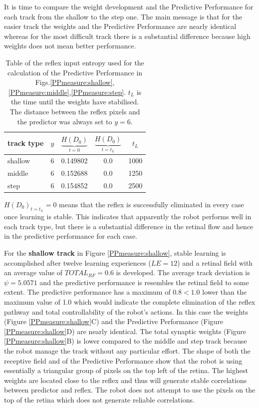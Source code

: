 It is time to compare the weight development and the Predictive Performance for
each track from the shallow to the step one.
The main message is that for the easier track the weights and the Predictive Performance
are nearly identical whereas for the most difficult track there is a substantial difference
because high weights does not mean better performance.
 
\begin{table}[htbp]
\caption[Reflex input values for the 3 tracks]{Table of the reflex input entropy used for the calculation of the Predictive Performance
in Figs.\ref{PPmeasure:shallow},\ref{PPmeasure:middle},\ref{PPmeasure:step}.
$t_L$ is the time until the weights have stabilised. The distance between the reflex pixels
and the predictor was always set to $y=6$.\label{table:PPmeausure:TableReflexFullTracks}}
\begin{center}
  \begin{tabular}{| l | c | c | c | c | }
    \hline
    \textbf{track type}  & $y$  & $\underbrace{H(D_{0})}_{t=0} $ & $\underbrace{H(D_{0})}_{t=t_L} $ & $t_L$ \\ \hline
    shallow 		 & 6 	& 0.149802 	    & 0.0 & 1000 \\ \hline
    middle  		 & 6    & 0.152688 	    & 0.0 & 1250 \\ \hline
    step    		 & 6 	& 0.154852 	    & 0.0 & 2500 \\ \hline
  \end{tabular}
\end{center}
\end{table}

$H(D_{0})_{t=t_L}=0$ means that the reflex is successfully eliminated in every case once learning is stable.
This indicates that apparently the robot performs well in each track type, but there is a substantial difference 
in the retinal flow and hence in the predictive performance for each case.

For the \textbf{shallow track} in Figure \ref{PPmeasure:shallow}, stable learning is accomplished
after twelve learning experiences ($LE=12$) and a retinal field with an average value of $TOTAL_{RF}=0.6$ is developed.
The average track deviation is $\psi=5.0571$ and the predictive performance is resembles
the retinal field to some extent.
The predictive performance has a maximum of $0.8 < 1.0$ lower than
the maximum value of 1.0 which would indicate the complete elimination of the reflex
pathway and total controllability of the robot's actions.
In this case the weights (Figure \ref{PPmeasure:shallow}C) and the Predictive Performance (Figure \ref{PPmeasure:shallow}D)
are nearly identical.
The total synaptic weights (Figure \ref{PPmeasure:shallow}B) is lower compared
to the middle and step track because the robot manage the track without any
particular effort.
The shape of both the receptive field and of the Predictive Performance show that
the robot is using essentially a triangular group of pixels on the top left of the retina.
The highest weights are located close to the reflex and thus will generate stable
correlations between predictor and reflex.
The robot does not attempt to use the pixels on the top of the retina which does
not generate reliable correlations.

